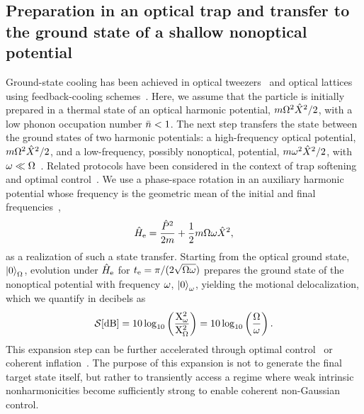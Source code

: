 \documentclass[reprint,prx,footinbib,floatfix,twocolumn,longbibliography,superscriptaddress]{revtex4-2}
\begin{document}
\subsection{Preparation in an optical trap and transfer to the ground state of a shallow nonoptical potential}
Ground-state cooling has been achieved in optical tweezers~\cite{Delic2020,Magrini2021,Tebbenjohanns2021,Piotrowski2023} and optical lattices~\cite{Kamba2022,Kamba2023} using feedback-cooling schemes~\cite{Rossi2018}.
Here, we assume that the particle is initially prepared in a thermal state of an optical harmonic potential, $m \Omega^2 \hat{X}^2/2$, with a low phonon occupation number $\bar{n} < 1$.
The next step transfers the state between the ground states of two harmonic potentials: a high-frequency optical potential, $m \Omega^2 \hat{X}^2/2$, and a low-frequency, possibly nonoptical, potential, $m \omega^2 \hat{X}^2/2$, with $\omega \ll \Omega$~\cite{Streltsov2021}.
Related protocols have been considered in the context of trap softening~\cite{Chen2010} and optimal control~\cite{Guery-Odelin2019}.
We use a phase-space rotation in an auxiliary harmonic potential whose frequency is the geometric mean of the initial and final frequencies~\cite{Chen2010},
\begin{align}
\hat{H}_{\text{e}} =  \frac{\hat{P}^2} { 2 m} + \frac{1}{2} m \Omega\omega \hat{X}^2,
\end{align} 
as a realization of such a state transfer.
Starting from the optical ground state, $\ket{0}_{\Omega}$, evolution under $\hat{H}_{\text{e}}$ for $t_{\text{e}} = \pi / (2 \sqrt{\Omega \omega})$ prepares the ground state of the nonoptical potential with frequency $\omega$, $\ket{0}_{\omega}$, yielding the motional delocalization, which we quantify in decibels as
\begin{align}
\mathcal{S} [\rm{dB}] = 10 \log_{10}\left( \frac{X_{\omega}^2}{X_{\Omega}^2} \right) = 10 \log_{10}\left( \frac{\Omega}{  \omega} \right).
\label{MotDec}
\end{align}
This expansion step can be further accelerated through optimal control~\cite{Guery-Odelin2019} or coherent inflation~\cite{Romero-Isart2017,Weiss2021}.
The purpose of this expansion is not to generate the final target state itself, but rather to transiently access a regime where weak intrinsic nonharmonicities become sufficiently strong to enable coherent non-Gaussian control.
\end{document}
